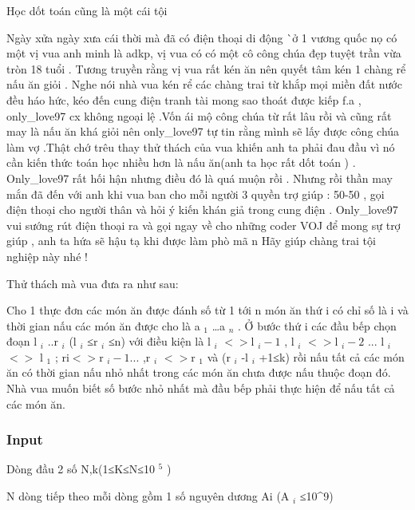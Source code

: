 



   Học dốt toán cũng là một cái tội  



   Ngày xửa ngày xưa cái thời mà đã có điện thoại di động ^^ ở 1 vương quốc nọ có một vị vua anh minh là adkp, vị vua có có một cô công chúa đẹp tuyệt trần vừa tròn 18 tuổi . Tương truyền rằng vị vua rất kén ăn nên quyết tâm kén 1 chàng rể nấu ăn giỏi . Nghe nói nhà vua kén rể các chàng trai từ khắp mọi miền đất nước đều háo hức, kéo đến cung điện tranh tài mong sao thoát được kiếp f.a , only\_love97 cx không ngoại lệ .Vốn ái mộ công chúa từ rất lâu rồi và cũng rất may là nấu ăn khá giỏi nên only\_love97 tự tin rằng mình sẽ lấy được công chúa làm vợ .Thật chớ trêu thay thử thách của vua khiến anh ta phải đau đầu vì nó cần kiến thức toán học nhiều hơn là nấu ăn(anh ta học rất dốt toán ) . Only\_love97 rất hối hận nhưng điều đó là quá muộn rồi . Nhưng rồi thần may mắn đã đến với anh khi vua ban cho mỗi người 3 quyền trợ giúp : 50-50 , gọi điện thoại cho người thân và hỏi ý kiến khán giả trong cung điện . Only\_love97 vui sướng rút điện thoại ra và gọi ngay về cho những coder VOJ để mong sự trợ giúp , anh ta hứa sẽ hậu tạ khi được làm phò mã ^^. Hãy giúp chàng trai tội nghiệp này nhé !  

   Thử thách mà vua đưa ra như sau:  

   Cho 1 thực đơn các món ăn được đánh số từ 1 tới n món ăn thứ i có chỉ số là i và thời gian nấu các món ăn được cho là a   $_    1   $   …a   $_    n   $   . Ở bước thứ i các đầu bếp chọn đoạn l   $_    i   $   ..r   $_    i   $   (l   $_    i   $   ≤r   $_    i   $   ≤n) với điều kiện là l   $_    i   $   $<$$>$l   $_    i-1   $   , l   $_    i   $   $<$$>$l   $_    i-2   $   ... l   $_    i   $   $<$$>$ l   $_    1   $   ; ri$<$$>$r   $_    i-1...   $   ,r   $_    i   $   $<$$>$r   $_    1   $   và (r   $_    i   $   -l   $_    i   $   +1≤k) rồi nấu tất cả các món ăn có thời gian nấu nhỏ nhất trong các món ăn chưa được nấu thuộc đoạn đó. Nhà vua muốn biết số bước nhỏ nhất mà đầu bếp phải thực hiện để nấu tất cả các món ăn.  

\subsubsection{   Input  }

   Dòng đầu 2 số N,k(1≤K≤N≤10   $^    5   $   )  

   N dòng tiếp theo mỗi dòng gồm 1 số nguyên dương Ai (A   $_    i   $   ≤10^9)  

